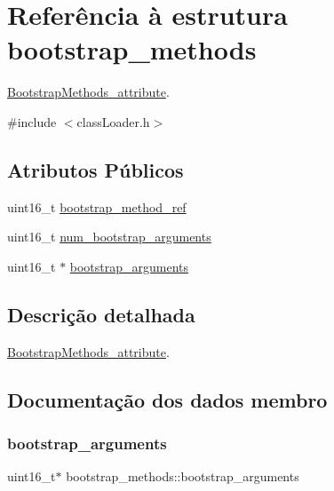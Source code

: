 \hypertarget{structbootstrap__methods}{}\section{Referência à estrutura bootstrap\+\_\+methods}
\label{structbootstrap__methods}


\hyperlink{struct_bootstrap_methods__attribute}{Bootstrap\+Methods\+\_\+attribute}.  




{\ttfamily \#include $<$class\+Loader.\+h$>$}

\subsection*{Atributos Públicos}
\begin{DoxyCompactItemize}
\item 
uint16\+\_\+t \hyperlink{structbootstrap__methods_a33f37a176a86272b33b23a3d73d7c866}{bootstrap\+\_\+method\+\_\+ref}
\item 
uint16\+\_\+t \hyperlink{structbootstrap__methods_a72a791a335cd158d3a358df48ddec3af}{num\+\_\+bootstrap\+\_\+arguments}
\item 
uint16\+\_\+t $\ast$ \hyperlink{structbootstrap__methods_a80e25c6d5ca58bd4f7dacdae18c7d003}{bootstrap\+\_\+arguments}
\end{DoxyCompactItemize}


\subsection{Descrição detalhada}
\hyperlink{struct_bootstrap_methods__attribute}{Bootstrap\+Methods\+\_\+attribute}. 

\subsection{Documentação dos dados membro}
\hypertarget{structbootstrap__methods_a80e25c6d5ca58bd4f7dacdae18c7d003}{}\label{structbootstrap__methods_a80e25c6d5ca58bd4f7dacdae18c7d003} 
\subsubsection{\texorpdfstring{bootstrap\+\_\+arguments}{bootstrap\_arguments}}
{\footnotesize\ttfamily uint16\+\_\+t$\ast$ bootstrap\+\_\+methods\+::bootstrap\+\_\+arguments}

